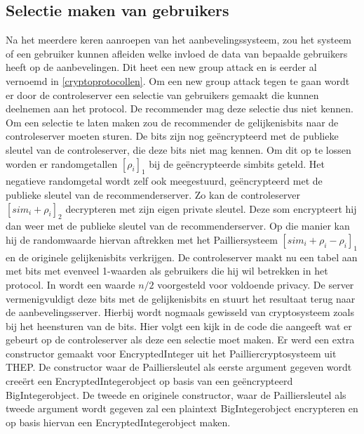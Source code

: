 \subsection{Selectie maken van gebruikers}
\label{selection}
Na het meerdere keren aanroepen van het aanbevelingssysteem, zou het systeem of een gebruiker kunnen afleiden welke invloed de data van bepaalde gebruikers heeft op de aanbevelingen. Dit heet een new group attack en is eerder al vernoemd in \ref{cryptoprotocollen}. Om een new group attack tegen te gaan wordt er door de controleserver een selectie van gebruikers gemaakt die kunnen deelnemen aan het protocol. De recommender mag deze selectie dus niet kennen. Om een selectie te laten maken zou de recommender de gelijkenisbits naar de controleserver moeten sturen. De bits zijn nog ge\"encrypteerd met de publieke sleutel van de controleserver, die deze bits niet mag kennen. Om dit op te lossen worden er randomgetallen $[\rho_i]_1$ bij de ge\"encrypteerde simbits geteld. Het negatieve randomgetal wordt zelf ook meegestuurd, ge\"encrypteerd met de publieke sleutel van de recommenderserver. Zo kan de controleserver $[sim_i+\rho_i]_2$ decrypteren met zijn eigen private sleutel. Deze som encrypteert hij dan weer met de publieke sleutel van de recommenderserver. Op die manier kan hij de randomwaarde hiervan aftrekken met het Pailliersysteem $[sim_i+\rho_i-\rho_i]_1$ en de originele gelijkenisbits verkrijgen. De controleserver maakt nu een tabel aan met bits met evenveel 1-waarden als gebruikers die hij wil betrekken in het protocol. In \cite{ZErkinDyn} wordt een waarde $n/2$ voorgesteld voor voldoende privacy. De server vermenigvuldigt deze bits met de gelijkenisbits en stuurt het resultaat terug naar de aanbevelingsserver. Hierbij wordt nogmaals gewisseld van cryptosysteem zoals bij het heensturen van de bits. Hier volgt een kijk in de code die aangeeft wat er gebeurt op de controleserver als deze een selectie moet maken. Er werd een extra constructor gemaakt voor EncryptedInteger uit het Pailliercryptosysteem uit THEP. De constructor waar de Pailliersleutel als eerste argument gegeven wordt cree\"ert een EncryptedIntegerobject op basis van een ge\"encrypteerd BigIntegerobject. De tweede en originele constructor, waar de Pailliersleutel als tweede argument wordt gegeven zal een plaintext BigIntegerobject encrypteren en op basis hiervan een EncryptedIntegerobject maken.


